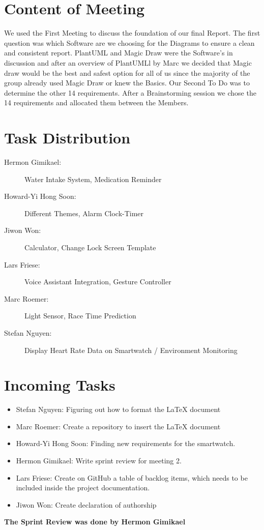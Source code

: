 \documentclass{article}
\begin{document}
\section*{Content of Meeting}
We used the First Meeting to discuss the foundation of our final Report. The first question was which Software are we choosing for the Diagrams to ensure a clean and consistent report. PlantUML and Magic Draw were the Software’s in discussion and after an overview of PlantUMLl by Marc we decided that Magic draw would be the best and safest option for all of us since the majority of the group already used Magic Draw or knew the Basics. Our Second To Do was to determine the other 14 requirements. After a Brainstorming session we chose the 14 requirements and allocated them between the Members.

\section*{Task Distribution}
\begin{description}
    \item[Hermon Gimikael:] Water Intake System, Medication Reminder 
    \item[Howard-Yi Hong Soon:] Different Themes, Alarm Clock-Timer
    \item[Jiwon Won:] Calculator, Change Lock Screen Template
    \item[Lars Friese:] Voice Assistant Integration, Gesture Controller
    \item[Marc Roemer:] Light Sensor, Race Time Prediction
    \item[Stefan Nguyen:] Display Heart Rate Data on Smartwatch / Environment Monitoring
\end{description}

\section*{Incoming Tasks}
\begin{itemize}
    \item Stefan Nguyen: Figuring out how to format the LaTeX document
    \item Marc Roemer: Create a repository to insert the LaTeX document
    \item Howard-Yi Hong Soon: Finding new requirements for the smartwatch.
    \item Hermon Gimikael: Write sprint review for meeting 2.
    \item Lars Friese: Create on GitHub a table of backlog items, which needs to be included inside the project documentation.
    \item Jiwon Won: Create declaration of authorship
\end{itemize}
\noindent
\textbf{The Sprint Review was done by Hermon Gimikael}
\newpage
\end{document}
